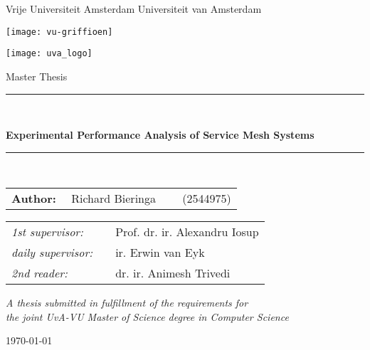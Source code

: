 \thispagestyle{empty}

\begin{center}
Vrije Universiteit Amsterdam \hspace*{2cm} Universiteit van Amsterdam

\vspace{1mm}

\hspace*{-7.5cm}\texttt{[image: vu-griffioen]}

\vspace*{-2cm}\hspace*{7.5cm}\texttt{[image: uva\_logo]}

\vspace{2cm}

{\Large Master Thesis}

\vspace*{1.5cm}

\rule{.9\linewidth}{.6pt}\\[0.4cm]
{\huge \bfseries 
    Experimental Performance Analysis of Service Mesh Systems
\par}\vspace{0.4cm}
\rule{.9\linewidth}{.6pt}\\[1.5cm]

\vspace*{2mm}

{\Large
\begin{tabular}{l}
{\bf Author:} ~~Richard Bieringa~~~~ (2544975)
\end{tabular}
}

\vspace*{1cm}

\begin{tabular}{ll}
{\it 1st supervisor:}   & ~~Prof. dr. ir. Alexandru Iosup \\
{\it daily supervisor:} & ~~ir. Erwin van Eyk \\
{\it 2nd reader:}       & ~~dr. ir. Animesh Trivedi
\end{tabular}

\vspace*{1cm}

\textit{A thesis submitted in fulfillment of the requirements for\\ the joint UvA-VU Master of Science degree in Computer Science}

\vspace*{1.8cm}

\today\\[4cm] %

\end{center}